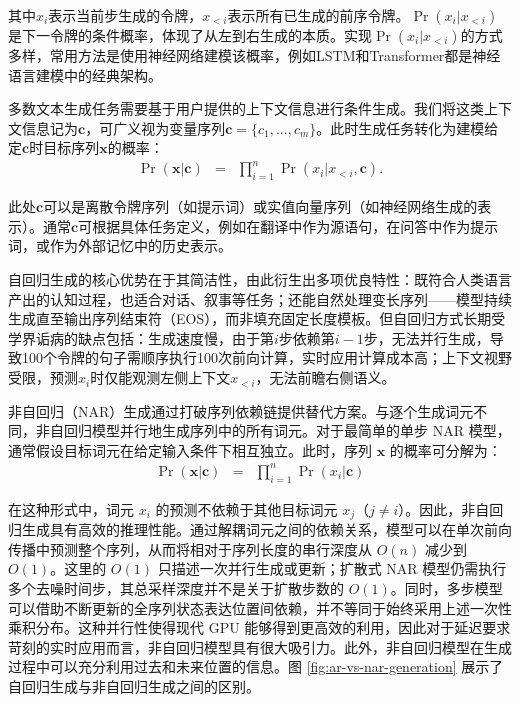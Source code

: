 \noindent 其中$x_i$表示当前步生成的令牌，$x_{<i}$表示所有已生成的前序令牌。$\Pr(x_i|x_{<i})$是下一令牌的条件概率，体现了从左到右生成的本质。实现$\Pr(x_i|x_{<i})$的方式多样，常用方法是使用神经网络建模该概率，例如LSTM和Transformer都是神经语言建模中的经典架构。

多数文本生成任务需要基于用户提供的上下文信息进行条件生成。我们将这类上下文信息记为$\mathbf{c}$，可广义视为变量序列$\mathbf{c} = \{c_1,...,c_m\}$。此时生成任务转化为建模给定$\mathbf{c}$时目标序列$\mathbf{x}$的概率：
\begin{eqnarray}
\Pr(\mathbf{x}|\mathbf{c}) & = & \prod_{i=1}^{n} \Pr(x_i|x_{<i},\mathbf{c}).
\end{eqnarray}

\noindent 此处$\mathbf{c}$可以是离散令牌序列（如提示词）或实值向量序列（如神经网络生成的表示）。通常$\mathbf{c}$可根据具体任务定义，例如在翻译中作为源语句，在问答中作为提示词，或作为外部记忆中的历史表示。

自回归生成的核心优势在于其简洁性，由此衍生出多项优良特性：既符合人类语言产出的认知过程，也适合对话、叙事等任务；还能自然处理变长序列——模型持续生成直至输出序列结束符（EOS），而非填充固定长度模板。但自回归方式长期受学界诟病的缺点包括：生成速度慢，由于第$i$步依赖第$i-1$步，无法并行生成，导致100个令牌的句子需顺序执行100次前向计算，实时应用计算成本高；上下文视野受限，预测$x_i$时仅能观测左侧上下文$x_{<i}$，无法前瞻右侧语义。

非自回归（NAR）生成通过打破序列依赖链提供替代方案\citep{gu-etal:2018non}。与逐个生成词元不同，非自回归模型并行地生成序列中的所有词元。对于最简单的单步 NAR 模型，通常假设目标词元在给定输入条件下相互独立。此时，序列 $\mathbf{x}$ 的概率可分解为：
\begin{eqnarray}
\Pr(\mathbf{x}|\mathbf{c}) & = & \prod_{i=1}^{n} \Pr(x_i|\mathbf{c})
\end{eqnarray}

在这种形式中，词元 $x_i$ 的预测不依赖于其他目标词元 $x_{j}$（$j \neq i$）。因此，非自回归生成具有高效的推理性能。通过解耦词元之间的依赖关系，模型可以在单次前向传播中预测整个序列，从而将相对于序列长度的串行深度从 $O(n)$ 减少到 $O(1)$。这里的 $O(1)$ 只描述一次并行生成或更新；扩散式 NAR 模型仍需执行多个去噪时间步，其总采样深度并不是关于扩散步数的 $O(1)$。同时，多步模型可以借助不断更新的全序列状态表达位置间依赖，并不等同于始终采用上述一次性乘积分布。这种并行性使得现代 GPU 能够得到更高效的利用，因此对于延迟要求苛刻的实时应用而言，非自回归模型具有很大吸引力。此外，非自回归模型在生成过程中可以充分利用过去和未来位置的信息。图 \ref{fig:ar-vs-nar-generation} 展示了自回归生成与非自回归生成之间的区别。

